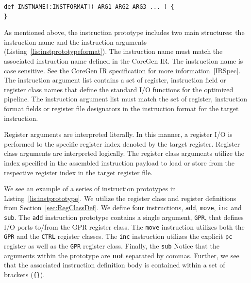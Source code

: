 \documentclass{article}
\begin{document}
\vspace{0.125in}
\begin{lstlisting}[frame=single,style=base,caption={Instruction Prototype Format},captionpos=b,label={lis:instprototypeformat}]
def INSTNAME[:INSTFORMAT]( ARG1 ARG2 ARG3 ... ) {
}
\end{lstlisting}

As mentioned above, the instruction prototype includes two main structures: the instruction 
name and the instruction arguments (Listing~\ref{lis:instprototypeformat}).  The instruction name must match the associated instruction 
name defined in the CoreGen IR.  The instruction name is case sensitive.  
See the CoreGen IR specification for more information~\ref{IRSpec}.  The instruction 
argument list contains a set of register, instruction field or register class names that define the standard I/O functions 
for the optimized pipeline.  The instruction argument list must match the set of register, instruction format fields or register file designators 
in the instruction format for the target instruction. 
  
Register arguments are interpreted literally.  In this manner, a register I/O is performed to the specific 
register index denoted by the target register.  Register class arguments are interpreted logically.  The register 
class arguments utilize the index specified in the assembled instruction payload to load or store from the respective 
register index in the target register file.  

We see an example of a series of instruction prototypes in Listing~\ref{lis:instprototype}.  We utilize the register class 
and register definitions from Section~\ref{sec:RegClassDef}.  We define four instructions, \texttt{add}, \texttt{move}, 
\texttt{inc} and \texttt{sub}.  The \texttt{add} instruction prototype contains a single argument, \texttt{GPR}, that defines I/O ports 
to/from the GPR register class.  The \texttt{move} instruction utilizes both the \texttt{GPR} and the \texttt{CTRL} 
register classes.  The \texttt{inc} instruction utilizes the explicit \texttt{pc} register as well as the \texttt{GPR} 
register class.  Finally, the \texttt{sub} Notice that the arguments within the prototype are \textbf{not} separated by commas.  Further, we see 
that the associated instruction definition body is contained within a set of brackets (\texttt{\{\}}).  
\end{document}
